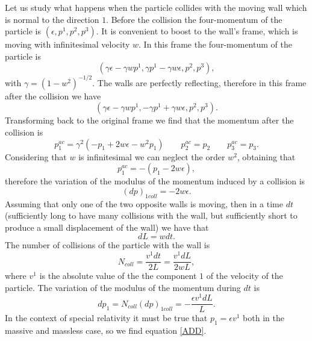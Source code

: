 \documentclass[useAMS,usenatbib,prd,twocolumn,nofootinbib]{revtex4-1}
\begin{document}
Let us study what happens when the particle collides with the moving wall which is normal to the direction $1$. Before the collision the four-momentum of the particle is $(\epsilon ,p^1,p^2,p^3)$. It is convenient to boost to the wall's frame, which is moving with infinitesimal velocity $w$. In this frame the four-momentum of the particle is
\begin{equation}
(\gamma \epsilon - \gamma w p^1, \gamma p^1 - \gamma w \epsilon, p^2,p^3 ),
\end{equation} 
with $\gamma=(1-w^2)^{-1/2}$. The walls are perfectly reflecting, therefore in this frame after the collision we have
\begin{equation}
(\gamma \epsilon - \gamma w p^1, -\gamma p^1 + \gamma w \epsilon, p^2,p^3 ).
\end{equation}
Transforming back to the original frame we find that the momentum after the collision is
\begin{equation}
p_1^{ac} = \gamma^2 (-p_1 + 2 w \epsilon  -w^2 p_1 )  \quad \quad p_2^{ac}=p_2  \quad \quad  p_3^{ac}=p_3.
\end{equation}
Considering that $w$ is infinitesimal we can neglect the order $w^2$, obtaining that 
\begin{equation}
p_1^{ac} = -(p_1 - 2w \epsilon),
\end{equation}
therefore the variation of the modulus of the momentum induced by a collision is
\begin{equation}
(dp)_{1coll} = -2w \epsilon.
\end{equation}
Assuming that only one of the two opposite walls is moving, then in a time $dt$ (sufficiently long to have many collisions with the wall, but sufficiently short to produce a small displacement of the wall) we have that 
\begin{equation}
dL = w dt.
\end{equation}
The number of collisions of the particle with the wall is
\begin{equation}
N_{coll} = \dfrac{v^1 dt}{2L} = \dfrac{v^1 dL}{2 w L},
\end{equation}
where $v^1$ is the absolute value of the the component $1$ of the velocity of the particle. The variation of the modulus of the momentum during $dt$ is
\begin{equation}
dp_1 = N_{coll} (dp)_{1coll} = -  \dfrac{\epsilon v^1 dL}{ L}.
\end{equation}
In the context of special relativity it must be true that $p_1 = \epsilon v^1$ both in the massive and massless case, so we find equation \eqref{ADD}.\\
\end{document}
